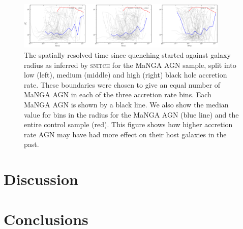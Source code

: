 \documentclass[useAMS,usenatbib]{mn2e}
\begin{document}
\begin{figure}
\includegraphics[width=0.9\textwidth]{../data/ellison/figures/median_deltatq_with_kpc_radius_ellison_splitmdot.png}
\caption{The spatially resolved time since quenching started against galaxy radius as inferred by \textsc{snitch} for the MaNGA AGN sample, split into low (left), medium (middle) and high (right) black hole accretion rate. These boundaries were chosen to give an equal number of MaNGA AGN in each of the three accretion rate bins. Each MaNGA AGN is shown by a black line. We also show the median value for bins in the radius for the MaNGA AGN (blue line) and the entire control sample (red). This figure shows how higher accretion rate AGN may have had more effect on their host galaxies in the past.}
\label{fig:spaghettimdot}
\end{figure}


\section{Discussion}\label{sec:disc}

\section{Conclusions}\label{sec:conc}


  
\end{document}
